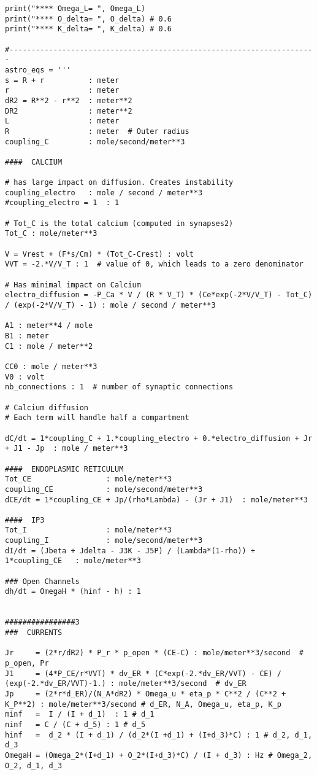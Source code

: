 \documentclass{article}
\begin{document}
\begin{verbatim}
print("**** Omega_L= ", Omega_L)
print("**** O_delta= ", O_delta) # 0.6
print("**** K_delta= ", K_delta) # 0.6

#----------------------------------------------------------------------
astro_eqs = '''
s = R + r          : meter
r                  : meter
dR2 = R**2 - r**2  : meter**2
DR2                : meter**2
L                  : meter
R                  : meter  # Outer radius
coupling_C         : mole/second/meter**3

####  CALCIUM

# has large impact on diffusion. Creates instability
coupling_electro   : mole / second / meter**3
#coupling_electro = 1  : 1 

# Tot_C is the total calcium (computed in synapses2)
Tot_C : mole/meter**3

V = Vrest + (F*s/Cm) * (Tot_C-Crest) : volt
VVT = -2.*V/V_T : 1  # value of 0, which leads to a zero denominator

# Has minimal impact on Calcium
electro_diffusion = -P_Ca * V / (R * V_T) * (Ce*exp(-2*V/V_T) - Tot_C) / (exp(-2*V/V_T) - 1) : mole / second / meter**3

A1 : meter**4 / mole 
B1 : meter 
C1 : mole / meter**2 

CC0 : mole / meter**3
V0 : volt
nb_connections : 1  # number of synaptic connections

# Calcium diffusion
# Each term will handle half a compartment 

dC/dt = 1*coupling_C + 1.*coupling_electro + 0.*electro_diffusion + Jr + J1 - Jp  : mole / meter**3

####  ENDOPLASMIC RETICULUM
Tot_CE                 : mole/meter**3
coupling_CE            : mole/second/meter**3
dCE/dt = 1*coupling_CE + Jp/(rho*Lambda) - (Jr + J1)  : mole/meter**3

####  IP3
Tot_I                  : mole/meter**3
coupling_I             : mole/second/meter**3
dI/dt = (Jbeta + Jdelta - J3K - J5P) / (Lambda*(1-rho)) + 1*coupling_CE   : mole/meter**3

### Open Channels
dh/dt = OmegaH * (hinf - h) : 1


################3
###  CURRENTS

Jr     = (2*r/dR2) * P_r * p_open * (CE-C) : mole/meter**3/second  # p_open, Pr
J1     = (4*P_CE/r*VVT) * dv_ER * (C*exp(-2.*dv_ER/VVT) - CE) / (exp(-2.*dv_ER/VVT)-1.) : mole/meter**3/second  # dv_ER
Jp     = (2*r*d_ER)/(N_A*dR2) * Omega_u * eta_p * C**2 / (C**2 + K_P**2) : mole/meter**3/second # d_ER, N_A, Omega_u, eta_p, K_p
minf   =  I / (I + d_1)  : 1 # d_1
ninf   = C / (C + d_5) : 1 # d_5
hinf   =  d_2 * (I + d_1) / (d_2*(I +d_1) + (I+d_3)*C) : 1 # d_2, d_1, d_3
OmegaH = (Omega_2*(I+d_1) + O_2*(I+d_3)*C) / (I + d_3) : Hz # Omega_2, O_2, d_1, d_3




\end{verbatim}
\end{document}
